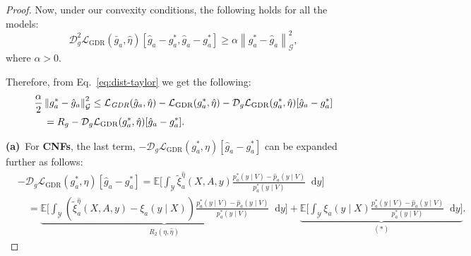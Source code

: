 \documentclass[dvipsnames]{article} %
\newcommand*\diff{\mathop{}\!\mathrm{d}}
\newcommand{\norm}[1]{\left\lVert#1\right\rVert}
\begin{document}
\begin{proof}
    Now, under our convexity conditions, the following holds for all the models:
    \begingroup\makeatletter\def\f@size{9}\check@mathfonts
    \begin{equation}
        \mathcal{D}_g^2\mathcal{L}_\text{{GDR}}(\bar{g}_a, \hat{\eta})[\hat{g}_a - g_a^*, \hat{g}_a - g_a^*] \ge \alpha \norm{g^*_a - \hat{g}_a}^2_\mathcal{G},
    \end{equation}
    \endgroup
    where $\alpha > 0$. 

    Therefore, from Eq.~\eqref{eq:dist-taylor} we get the following:
    \begingroup\makeatletter\def\f@size{9}\check@mathfonts
    \begin{align} \label{eq:qo-eff-middle}
        & \frac{\alpha}{2} \norm{g^*_a - \hat{g}_a}^2_\mathcal{G} \le \mathcal{L}_\text{\emph{GDR}}(\hat{g}_a, \hat{\eta}) - \mathcal{L}_\text{{GDR}}({g}_a^*, \hat{\eta}) - \mathcal{D}_g\mathcal{L}_\text{{GDR}}({g}_a^*, \hat{\eta})[\hat{g}_a - g_a^*] \\
        &\quad  =  R_g - \mathcal{D}_g\mathcal{L}_\text{{GDR}}({g}_a^*, \hat{\eta})[\hat{g}_a - g_a^*].
    \end{align}
    \endgroup

    \textbf{(a)}~For \textbf{CNFs}, the last term, $- \mathcal{D}_g\mathcal{L}_\text{{GDR}}({g}_a^*, \eta)[\hat{g}_a - g_a^*]$ can be expanded further as follows:
    \begingroup\makeatletter\def\f@size{8}\check@mathfonts
    \begin{align}
        & - \mathcal{D}_g\mathcal{L}_\text{{GDR}}({g}_a^*, \eta)[\hat{g}_a - g_a^*] = \mathbb{E} \bigg[\int_{\mathcal{Y}}\tilde{\xi}^{\hat{\eta}}_a(X, A, y)  \frac{p_a^*(y \mid V) - \hat{p}_a(y \mid V)}{p_a^*(y \mid V)} \diff y \bigg] \\
        & \quad = \underbrace{\mathbb{E} \bigg[\int_{\mathcal{Y}} (\tilde{\xi}^{\hat{\eta}}_a(X, A, y) -\xi_a(y \mid X) ) \frac{p_a^*(y \mid V) - \hat{p}_a(y \mid V)}{p_a^*(y \mid V)} \diff y \bigg]}_{R_2(\eta, \hat{\eta})} + \underbrace{\mathbb{E} \bigg[\int_{\mathcal{Y}} \xi_a(y \mid X) \frac{p_a^*(y \mid V) - \hat{p}_a(y \mid V)}{p_a^*(y \mid V)} \diff y \bigg]}_{(*)}.
    \end{align}
    \endgroup
    

\end{proof}
\end{document}
